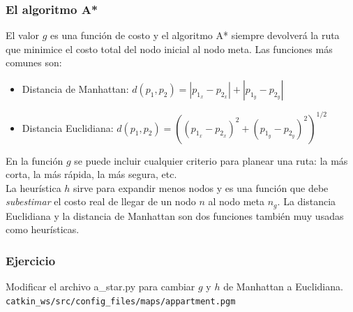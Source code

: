 \begin{frame}\frametitle{El algoritmo A*}
  El valor $g$ es una función de costo y el algoritmo A* siempre devolverá la ruta que minimice el costo total del nodo inicial al nodo meta. Las funciones más comunes son:
  \begin{itemize}
  \item Distancia de Manhattan: $d(p_1, p_2) = |p_{1_x} - p_{2_x}| + |p_{1_y} - p_{2_y}|$
  \item Distancia Euclidiana: $d(p_1, p_2) = \left( (p_{1_x} - p_{2_x})^2 + (p_{1_y} - p_{2_y})^2 \right)^{1/2}$
  \end{itemize}
  En la función $g$ se puede incluir cualquier criterio para planear una ruta: la más corta, la más rápida, la más segura, etc.\\
  La heurística $h$ sirve para expandir menos nodos y es una función que debe \textit{subestimar} el costo real de llegar de un nodo $n$ al nodo meta $n_g$. La distancia Euclidiana y la distancia de Manhattan son dos funciones también muy usadas como heurísticas. 
\end{frame}

\begin{frame}[containsverbatim]\frametitle{Ejercicio}
  Modificar el archivo a\_star.py para cambiar $g$ y $h$ de Manhattan a Euclidiana.
  \texttt{catkin\_ws/src/config\_files/maps/appartment.pgm}
    
\end{frame}


